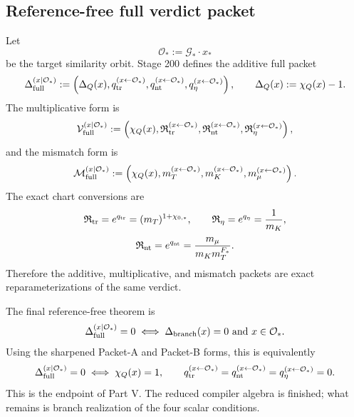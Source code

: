 \subsection{Reference-free full verdict packet}
Let
\begin{equation}
\label{eq:part05-target-orbit}
\mathcal O_*:=\mathcal G_*\cdot x_*
\end{equation}
be the target similarity orbit.  Stage 200 defines the additive full packet
\begin{equation}
\label{eq:part05-full-packet-additive}
\Delta_{\rm full}^{(x\mid\mathcal O_*)}
:=
\left(
\Delta_Q(x),
q_{\rm tr}^{(x\leftarrow\mathcal O_*)},
q_{\rm nt}^{(x\leftarrow\mathcal O_*)},
q_\eta^{(x\leftarrow\mathcal O_*)}
\right),
\qquad
\Delta_Q(x):=\chi_Q(x)-1.
\end{equation}
The multiplicative form is
\begin{equation}
\label{eq:part05-full-packet-multiplicative}
\mathcal V_{\rm full}^{(x\mid\mathcal O_*)}
:=
\left(
\chi_Q(x),
\mathfrak R_{\rm tr}^{(x\leftarrow\mathcal O_*)},
\mathfrak R_{\rm nt}^{(x\leftarrow\mathcal O_*)},
\mathfrak R_\eta^{(x\leftarrow\mathcal O_*)}
\right),
\end{equation}
and the mismatch form is
\begin{equation}
\label{eq:part05-full-packet-mismatch}
\mathcal M_{\rm full}^{(x\mid\mathcal O_*)}
:=
\left(
\chi_Q(x),
 m_T^{(x\leftarrow\mathcal O_*)},
 m_K^{(x\leftarrow\mathcal O_*)},
 m_\mu^{(x\leftarrow\mathcal O_*)}
\right).
\end{equation}
The exact chart conversions are
\begin{equation}
\label{eq:part05-chart-conversions-1}
\mathfrak R_{\rm tr}=e^{q_{\rm tr}}=(m_T)^{1+\chi_{0,*}},
\qquad
\mathfrak R_\eta=e^{q_\eta}=\frac{1}{m_K},
\end{equation}
\begin{equation}
\label{eq:part05-chart-conversions-2}
\mathfrak R_{\rm nt}=e^{q_{\rm nt}}=\frac{m_\mu}{m_Km_T^{F_*}}.
\end{equation}
Therefore the additive, multiplicative, and mismatch packets are exact reparameterizations of the same verdict.

The final reference-free theorem is
\begin{equation}
\label{eq:part05-reference-free-home-stretch}
\Delta_{\rm full}^{(x\mid\mathcal O_*)}=0
\iff
\Delta_{\rm branch}(x)=0
\text{ and }
x\in\mathcal O_*.
\end{equation}
Using the sharpened Packet-A and Packet-B forms, this is equivalently
\begin{equation}
\label{eq:part05-reference-free-expanded}
\Delta_{\rm full}^{(x\mid\mathcal O_*)}=0
\iff
\chi_Q(x)=1,
\qquad
q_{\rm tr}^{(x\leftarrow\mathcal O_*)}=q_{\rm nt}^{(x\leftarrow\mathcal O_*)}=q_\eta^{(x\leftarrow\mathcal O_*)}=0.
\end{equation}
This is the endpoint of Part V.  The reduced compiler algebra is finished; what remains is branch realization of the four scalar conditions.

